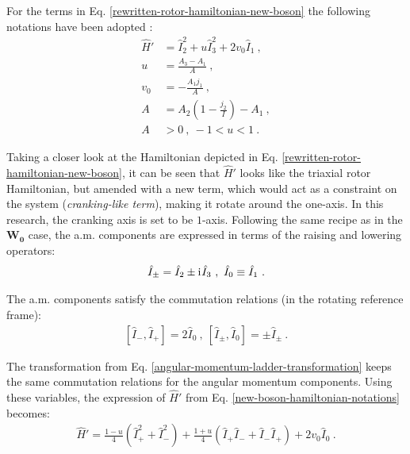 For the terms in Eq. \ref{rewritten-rotor-hamiltonian-new-boson} the following notations have been adopted \cite{raduta2020new}:
\begin{align}
    \hat{H}'&=\hat{I}_2^2+u\hat{I}_3^2+2v_0\hat{I}_1\ ,\nonumber\\
    u&=\frac{A_3-A_1}{A}\ ,\nonumber\\
    v_0&=-\frac{A_1j_1}{A}\ ,\nonumber\\
    A&=A_2\left(1-\frac{j_2}{I}\right)-A_1\ ,\nonumber\\
    A&>0\ ,\ -1<u<1\ .
    \label{new-boson-hamiltonian-notations}
\end{align}

Taking a closer look at the Hamiltonian depicted in Eq. \ref{rewritten-rotor-hamiltonian-new-boson}, it can be seen that $\hat{H}'$ looks like the triaxial rotor Hamiltonian, but amended with a new term, which would act as a constraint on the system (\emph{cranking-like term}), making it rotate around the one-axis. In this research, the cranking axis is set to be $1$-axis. Following the same recipe as in the $\mathbf{W_0}$ case, the a.m. components are expressed in terms of the raising and lowering operators:
\begin{align}
    \hat{I}_\pm=\hat{I}_2\pm\mathrm{i}\mkern1mu\hat{I}_3\ ,\ \hat{I}_0\equiv\hat{I}_1\ .
\end{align}

The a.m. components satisfy the commutation relations (in the rotating reference frame):
\begin{align}
    \left[\hat{I}_-,\hat{I}_+\right]=2\hat{I}_0\ ,\ \left[\hat{I}_\pm,\hat{I}_0\right]=\pm\hat{I}_\pm\ .
    \label{angular-momentum-ladder-transformation}
\end{align}

The transformation from Eq. \ref{angular-momentum-ladder-transformation} keeps the same commutation relations for the angular momentum components. Using these variables, the expression of $\hat{H}'$ from Eq. \ref{new-boson-hamiltonian-notations} becomes:
\begin{align}
    \hat{H}'=\frac{1-u}{4}\left(\hat{I}_+^2+\hat{I}_-^2\right)+\frac{1+u}{4}\left(\hat{I}_+\hat{I}_-+\hat{I}_-\hat{I}_+\right)+2v_0\hat{I}_0\ .
    \label{hamiltonian-new-boson-ladder-operators}
\end{align}

